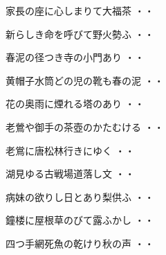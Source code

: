 \vspace{0.4cm}
\begin{shiika}家長の座に心しまりて大福茶
\hfill{・・}\end{shiika}
\vspace{0.4cm}
\begin{shiika}新らしき命を呼びて野火勢ふ
\hfill{・・}\end{shiika}
\vspace{0.4cm}
\begin{shiika}春泥の径つき寺の小門あり
\hfill{・・}\end{shiika}
\vspace{0.4cm}
\begin{shiika}黄帽子水筒どの児の靴も春の泥
\hfill{・・}\end{shiika}
\vspace{0.4cm}
\begin{shiika}花の奥雨に煙れる塔のあり
\hfill{・・}\end{shiika}
\vspace{0.4cm}
\begin{shiika}老鶯や御手の茶壺のかたむける
\hfill{・・}\end{shiika}
\vspace{0.4cm}
\begin{shiika}老鴬に唐松林行きにゆく
\hfill{・・}\end{shiika}
\vspace{0.4cm}
\begin{shiika}湖見ゆる古戦場道落し文
\hfill{・・}\end{shiika}
\vspace{0.4cm}
\begin{shiika}病妹の欲りし日とあり梨供ふ
\hfill{・・}\end{shiika}
\vspace{0.4cm}
\begin{shiika}鐘楼に屋根草のびて露ふかし
\hfill{・・}\end{shiika}
\vspace{0.4cm}
\begin{shiika}四つ手網死魚の乾けり秋の声
\hfill{・・}\end{shiika}
